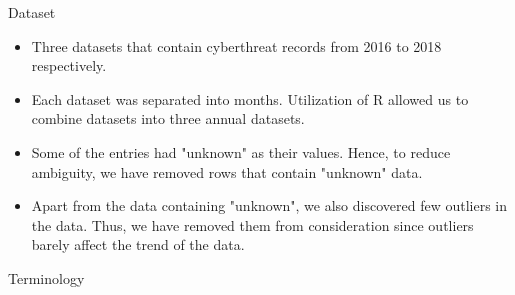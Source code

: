 \documentclass[final]{beamer}
\newlength{\colwidth}
\begin{document}
\begin{frame}[t]
\begin{columns}[t]
\begin{column}{\colwidth}
  \begin{block}{Dataset}
    \begin{itemize}
        \item Three datasets that contain cyberthreat records from 2016 to 2018 respectively.
        \item Each dataset was separated into months. Utilization of R allowed us to combine datasets into three annual datasets. 
        \item Some of the entries had "unknown" as their values. Hence, to reduce ambiguity, we have removed rows that contain "unknown" data. 
        \item Apart from the data containing "unknown", we also discovered few outliers in the data. Thus, we have removed them from consideration since outliers barely affect the trend of the data. 
    \end{itemize}
  \end{block}
  

  \begin{alertblock}{Terminology}
  
   
        


\end{alertblock}
\end{column}
\end{columns}
\end{frame}
\end{document}
